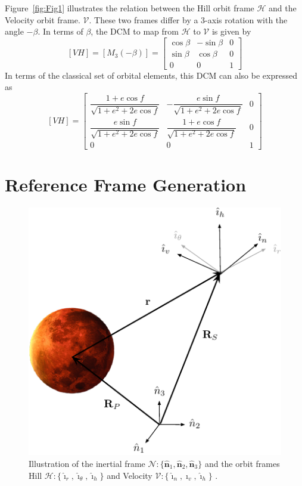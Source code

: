 \documentclass[]{AVSSimReportMemo}
\begin{document}
Figure~\ref{fig:Fig1} illustrates the relation between the Hill orbit frame $\mathcal{H}$ and the Velocity orbit frame.  $\mathcal{V}$. These two frames differ by a 3-axis rotation with the angle $-\beta$.  In terms of $\beta$, the DCM to map from $\mathcal{H}$ to $\mathcal{V}$ is given by
\begin{equation}
  \label{eq:VH1}
  [VH] = [M_{3}(-\beta)] = \begin{bmatrix}
    \cos\beta & -\sin\beta & 0 \\
    \sin\beta & \cos\beta &0 \\
    0 & 0 & 1
  \end{bmatrix}
\end{equation}
In terms of the classical set of orbital elements, this DCM can also be expressed as
\begin{equation}
  \label{eq:VH2}
  [VH] = \begin{bmatrix}
    \dfrac{1 + e \cos f}{\sqrt{1+e^{2}+2e \cos f}} & 
    -\dfrac{e \sin f}{\sqrt{1+e^{2}+2e \cos f} }
    & 0 \\
    \dfrac{e \sin f}{\sqrt{1+e^{2}+2e \cos f}}  & \dfrac{1 + e \cos f}{\sqrt{1+e^{2}+2e \cos f}} & 0\\
    0 & 0 & 1
  \end{bmatrix}
\end{equation}

\section{Reference Frame Generation}
\begin{figure}[htb]
  \centerline{ \includegraphics{Figures/Fig1}}
  \caption{Illustration of the inertial frame $\mathcal{N}:\{ \hat{\bm n}_{1}, \hat{\bm n}_{2}, \hat{\bm n}_{3} \}$ and the orbit frames Hill $\mathcal{H}:\{ \hat{\bm\imath}_{r}, \hat{\bm\imath}_{\theta}, \hat{\bm\imath}_{h} \}$ and Velocity $\mathcal{V}:\{ \hat{\bm\imath}_{n}, \hat{\bm\imath}_{v}, \hat{\bm\imath}_{h} \}$ .}
  \label{fig:Fig2}
\end{figure}
\end{document}
